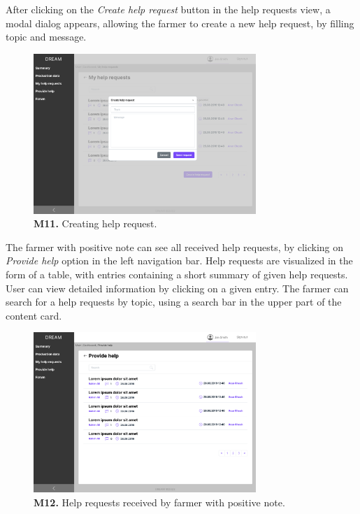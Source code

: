     After clicking on the \textit{Create help request} button in the help requests view, a modal dialog appears, allowing the farmer to create a new help request, by filling topic and message.
    \begin{figure}[H]
        \centering
        \includegraphics[width=0.75\textwidth]{mockups/Farmer_Dashboard_My help requests_Create help request.png}
        \caption{\textbf{M11.} Creating help request.}
    \end{figure}
    
    The farmer with positive note can see all received help requests, by clicking on \textit{Provide help} option in the left navigation bar. Help requests are visualized in the form of a table, with entries containing a short summary of given help requests. User can view detailed information by clicking on a given entry. The farmer can search for a help requests by topic, using a search bar in the upper part of the content card.
    \begin{figure}[H]
        \centering
        \includegraphics[width=0.75\textwidth]{mockups/Farmer_Dashboard_Provide help.png}
        \caption{\textbf{M12.} Help requests received by farmer with positive note.}
        \label{fig:farmer-provide-help}
    \end{figure}
    
